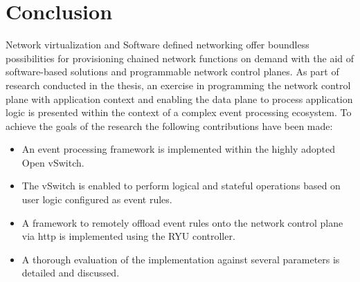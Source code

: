 \section{Conclusion}
Network virtualization and Software defined networking offer boundless possibilities for provisioning chained network functions on demand with the aid of software-based solutions and programmable network control planes. As part of research conducted in the thesis, an exercise in programming the network control plane with application context and enabling the data plane to process application logic is presented within the context of a complex event processing ecosystem. To achieve the goals of the research the following contributions have been made:
\begin{itemize}
	\item An event processing framework is implemented within the highly adopted Open vSwitch.
	\item The vSwitch is enabled to perform logical and stateful operations based on user logic configured as event rules.
	\item A framework to remotely offload event rules onto the network control plane via http is implemented using the RYU controller.
	\item A thorough evaluation of the implementation against several parameters is detailed and discussed.
\end{itemize}
